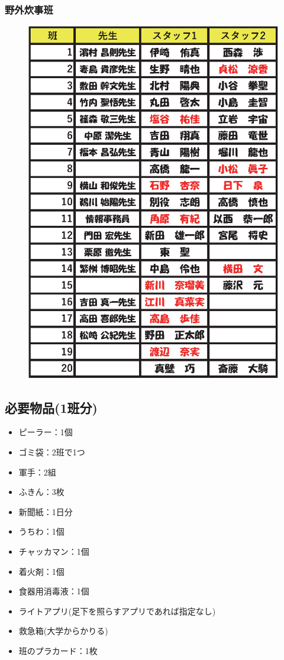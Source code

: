 \subsubsection{野外炊事班}
\begin{figure}[H]
\begin{center}
\includegraphics[scale=0.9]{./09/yagaisuijihanwake.eps}
\end{center}
\end{figure}


\subsection{必要物品(1班分)}
\begin{itemize}
  \item ピーラー：1個
  \item ゴミ袋：2班で1つ
  \item 軍手：2組
  \item ふきん：3枚
  \item 新聞紙：1日分
  \item うちわ：1個
  \item チャッカマン：1個
  \item 着火剤：1個
  \item 食器用消毒液：1個
  \item ライトアプリ(足下を照らすアプリであれば指定なし)
  \item 救急箱(大学からかりる)
  \item 班のプラカード：1枚
\end{itemize}

